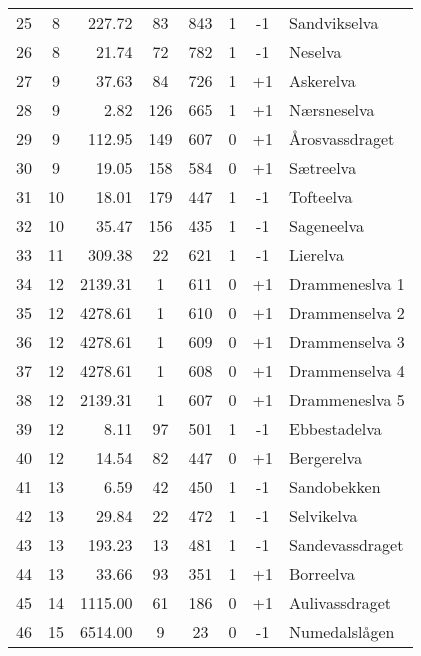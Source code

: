 \begin{center}
\begin{supertabular}{ccrccccl}
  25	& 8	& 227.72	& 83		& 843		& 1		& -1	& Sandvikselva                 	\\
  26	& 8	& 21.74		& 72		& 782		& 1		& -1	& Neselva			\\
  27	& 9	& 37.63		& 84		& 726		& 1		& +1	& Askerelva                   	\\
  28	& 9	& 2.82		& 126		& 665		& 1		& +1	& N{\ae}rsneselva		\\
  29	& 9	& 112.95	& 149		& 607		& 0		& +1	& {\AA}rosvassdraget		\\
  30	& 9	& 19.05		& 158		& 584		& 0		& +1	& S{\ae}treelva               	\\
  31	& 10	& 18.01		& 179		& 447		& 1		& -1	& Tofteelva			\\
  32	& 10	& 35.47		& 156		& 435		& 1		& -1	& Sageneelva			\\
  33	& 11	& 309.38	& 22		& 621		& 1		& -1	& Lierelva			\\
  34	& 12	& 2139.31	& 1		& 611		& 0		& +1	& Drammeneslva 1		\\
  35	& 12	& 4278.61	& 1		& 610		& 0		& +1	& Drammenselva 2		\\
  36	& 12	& 4278.61	& 1		& 609		& 0		& +1	& Drammenselva 3		\\
  37	& 12	& 4278.61	& 1		& 608		& 0		& +1	& Drammenselva 4		\\
  38	& 12	& 2139.31	& 1		& 607		& 0		& +1	& Drammeneslva 5		\\
  39	& 12	& 8.11		& 97		& 501		& 1		& -1	& Ebbestadelva   		\\
  40	& 12	& 14.54		& 82		& 447		& 0		& +1	& Bergerelva    		\\
  41	& 13	& 6.59		& 42		& 450		& 1		& -1	& Sandobekken    		\\
  42	& 13	& 29.84		& 22		& 472		& 1		& -1	& Selvikelva  			\\
  43	& 13	& 193.23	& 13		& 481		& 1		& -1	& Sandevassdraget   		\\
  44	& 13	& 33.66		& 93		& 351		& 1		& +1	& Borreelva       		\\
  45	& 14	& 1115.00	& 61		& 186		& 0		& +1	& Aulivassdraget      		\\
  46	& 15	& 6514.00	& 9		& 23		& 0		& -1	& Numedalsl{\aa}gen  		\\
 \end{supertabular}
\label{tab:rivers01}
\end{center}
\vspace{5mm}

